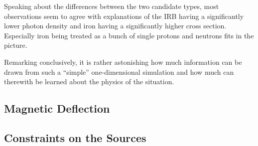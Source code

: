 Speaking about the differences between the two candidate types, most
observations seem to agree with explanations of the IRB having a significantly
lower photon density and iron having a significantly higher cross section.
Especially iron being treated as a bunch of single protons and neutrons fits in
the picture.

Remarking conclusively, it is rather astonishing how much information can be
drawn from such a \enquote{simple} one-dimensional simulation and how much can
therewith be learned about the physics of the situation.


\subsection{Magnetic Deflection}


\subsection{Constraints on the Sources}


